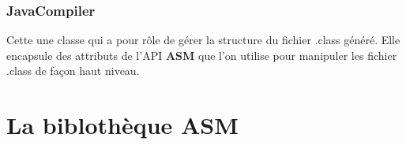 \documentclass[12pt, a4paper, one side]{article}
\begin{document}
    \subsubsection{JavaCompiler}
    Cette une classe qui a pour rôle de gérer la structure du fichier .class généré. Elle encapsule des attributs de l'API \textbf{ASM} que l'on utilise pour manipuler les fichier .class de façon haut niveau.

    \section{La biblothèque ASM}
\end{document}
